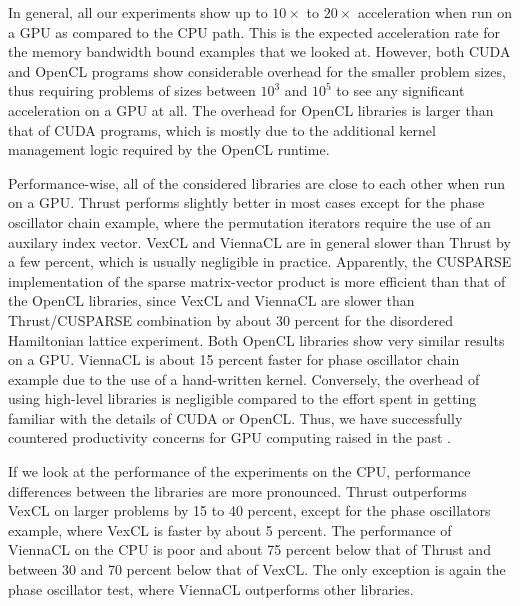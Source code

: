 \documentclass[final]{siamltex}
\begin{document}
In general, all our experiments show up to $10\times$ to $20\times$ acceleration
when run on a GPU as compared to the CPU path. This is the expected acceleration
rate for the memory bandwidth bound examples that we looked at. However, both CUDA and OpenCL
programs show considerable overhead for the smaller problem sizes,
thus requiring problems of sizes between $10^3$ and $10^5$ to see any significant acceleration on
a GPU at all. The overhead for OpenCL libraries is larger than that of CUDA programs,
which is mostly due to the additional kernel management logic required by the OpenCL runtime.

Performance-wise, all of the considered libraries are close to each other when
run on a GPU.  Thrust performs slightly better in most cases except for the phase oscillator chain example,
where the permutation iterators require the use of an auxilary index vector.
VexCL and ViennaCL are in general slower than Thrust by a few percent, which is usually negligible in practice.
Apparently, the CUSPARSE implementation of the sparse matrix-vector product is more efficient than that of the OpenCL
libraries, since VexCL and ViennaCL are slower than Thrust/CUSPARSE combination
by about 30 percent for the disordered Hamiltonian lattice experiment. Both
OpenCL libraries show very similar results on a GPU. ViennaCL is about 15 percent faster for
phase oscillator chain example due to the use of a hand-written kernel.
Conversely, the overhead of using high-level libraries is negligible compared to the effort spent in getting familiar with the details of CUDA or OpenCL.
Thus, we have successfully countered productivity concerns for GPU computing raised in the past \cite{bordawekar:gpu-productivity}.

If we look at the performance of the experiments on the CPU, performance
differences between the libraries are more pronounced. Thrust outperforms
VexCL on larger problems by 15 to 40 percent, except for the phase
oscillators example, where VexCL is faster by about 5 percent.
The performance of ViennaCL on the CPU is poor and about 75 percent below that of Thrust and between 30 and 70 percent below that of VexCL.
The only exception is again the phase oscillator test, where ViennaCL outperforms other libraries.
\end{document}
